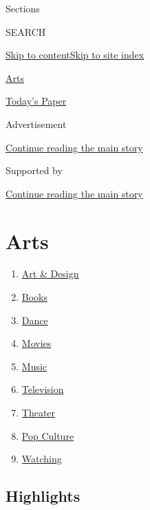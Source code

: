 Sections

SEARCH

\protect\hyperlink{site-content}{Skip to
content}\protect\hyperlink{site-index}{Skip to site index}

\href{https://www.nytimes3xbfgragh.onion/section/arts}{Arts}

\href{https://myaccount.nytimes3xbfgragh.onion/auth/login?response_type=cookie\&client_id=vi}{}

\href{https://www.nytimes3xbfgragh.onion/section/todayspaper}{Today's
Paper}

Advertisement

\protect\hyperlink{after-top}{Continue reading the main story}

Supported by

\protect\hyperlink{after-sponsor}{Continue reading the main story}

\hypertarget{arts}{%
\section{Arts}\label{arts}}

\begin{enumerate}
\def\labelenumi{\arabic{enumi}.}
\tightlist
\item
  \href{/section/arts/design}{Art \& Design}
\item
  \href{/section/books}{Books}
\item
  \href{/section/arts/dance}{Dance}
\item
  \href{/section/movies}{Movies}
\item
  \href{/section/arts/music}{Music}
\item
  \href{/section/arts/television}{Television}
\item
  \href{/section/theater}{Theater}
\item
  \href{/spotlight/pop-culture}{Pop Culture}
\item
  \href{/watching}{Watching}
\end{enumerate}

\hypertarget{highlights}{%
\subsection{Highlights}\label{highlights}}

